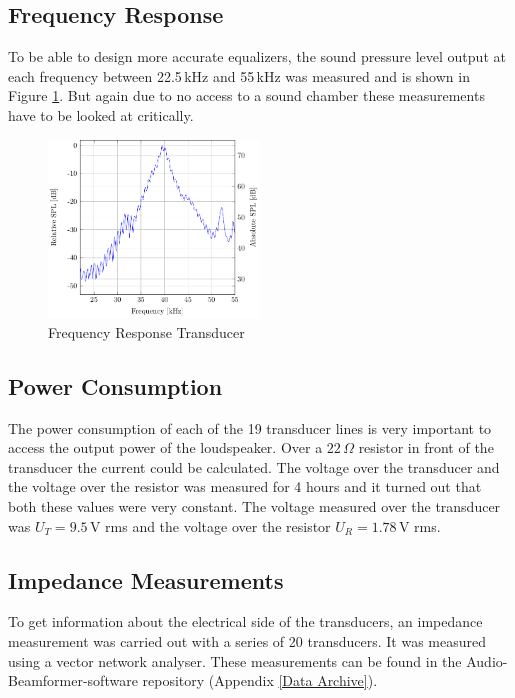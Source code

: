 \subsection{Frequency Response}\label{6_sec:Frequency_response}
To be able to design more accurate equalizers, the sound pressure level output at each frequency between 22.5\,kHz and 55\,kHz was measured and is shown in Figure \ref{6_Measurement_fig:Transducer_FR}. But again due to no access to a sound chamber these measurements have to be looked at critically.
\begin{figure}[h!]
    \centering
    \includegraphics[width=0.5\textwidth]{images/6_Measurements/Transducer_Frequency_Respone.pdf}
    \caption{Frequency Response Transducer}
    \label{6_Measurement_fig:Transducer_FR}
\end{figure}
\subsection{Power Consumption}\label{6_subsec:Power_cons}
The power consumption of each of the 19 transducer lines is very important to access the output power of the loudspeaker. Over a $22 \, \Omega$ resistor in front of the transducer the current could be calculated. The voltage over the transducer and the voltage over the resistor was measured for 4 hours and it turned out that both these values were very constant. The voltage measured over the transducer was $U_T = 9.5 \,$V \acrshort{rms} and the voltage over the resistor $U_R = 1.78 \,$V \acrshort{rms}.
\subsection{Impedance Measurements}\label{6_subsec:impedance_measure}
To get information about the electrical side of the transducers, an impedance measurement was carried out with a series of 20 transducers. It was measured using a vector network analyser.
These measurements can be found in the Audio-Beamformer-software repository (Appendix \ref{Data Archive}).
\newpage
